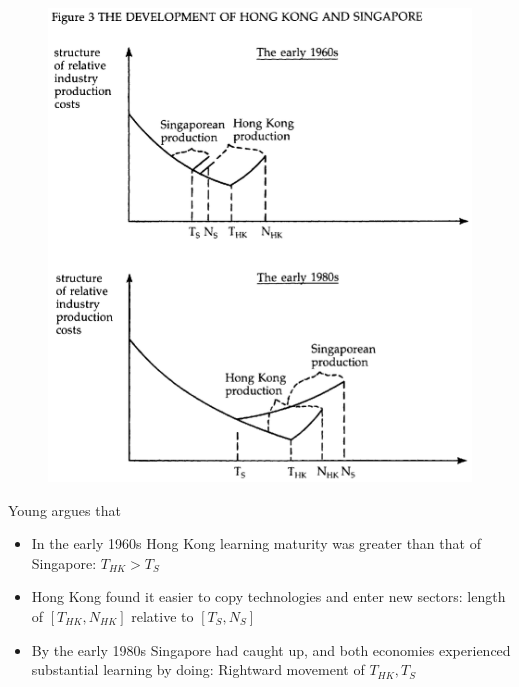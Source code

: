 \documentclass{beamer}
\begin{document}
\begin{frame}
  \begin{figure}
    \includegraphics[scale=.7]{young4.eps}
  \end{figure}
\end{frame}

\begin{frame}
  Young argues that
\begin{itemize}
  \item In the early 1960s Hong Kong learning maturity was greater than that of Singapore: $T_{HK}>T_S$
  \item Hong Kong found it easier to copy technologies and enter new sectors: length of $[T_{HK},N_{HK}]$ relative to $[T_{S},N_{S}]$
  \item By the early 1980s Singapore had caught up, and both economies experienced substantial learning by doing: Rightward movement of $T_{HK},T_S$  
\end{itemize}
\end{frame}
\end{document}
